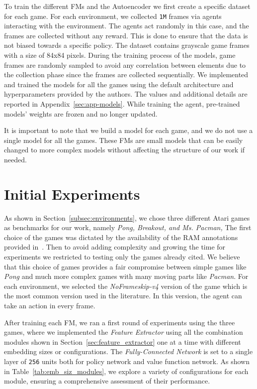 To train the different FMs and the Autoencoder we first create a specific dataset for each game.
For each environment, we collected \texttt{1M} frames via agents interacting with the environment.
The agents act randomly in this case, and the frames are collected without any reward.
This is done to ensure that the data is not biased towards a specific policy.
The dataset contains grayscale game frames with a size of 84x84 pixels.
During the training process of the models, game frames are randomly sampled to avoid any correlation between elements due to the collection phase since the frames are collected sequentially.
We implemented and trained the models for all the games using the default architecture and hyperparameters provided by the authors.
The values and additional details are reported in Appendix~\ref{sec:app-models}.
While training the agent, pre-trained models' weights are frozen and no longer updated.

It is important to note that we build a model for each game, and we do not use a single model for all the games.
These FMs are small models that can be easily changed to more complex models without affecting the structure of our work if needed.


\section{Initial Experiments}\label{sec:init_exp}
As shown in Section~\ref{subsec:environments}, we chose three different Atari games as benchmarks for our work, namely \textit{Pong, Breakout, and Ms. Pacman,}
The first choice of the games was dictated by the availability of the RAM annotations provided in~\cite{anand2019unsupervised}.
Then to avoid adding complexity and growing the time for experiments we restricted to testing only the games already cited.
We believe that this choice of games provides a fair compromise between simple games like \textit{Pong} and much more complex games with many moving parts like \textit{Pacman}.
For each environment, we selected the \textit{NoFrameskip-v4} version of the game which is the most common version used in the literature. 
In this version, the agent can take an action in every frame.

After training each FM, we ran a first round of experiments using the three games, where we implemented the \textit{Feature Extractor} using all the combination modules shown in Section~\ref{sec:feature_extractor} one at a time with different embedding sizes or configurations.
The \textit{Fully-Connected Network} is set to a single layer of \texttt{256} units both for policy network and value function network.
As shown in Table~\ref{tab:emb_siz_modules}, we explore a variety of configurations for each module, ensuring a comprehensive assessment of their performance.

